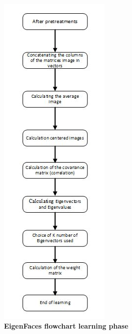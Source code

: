 \begin{figure}[bth]%
\begin{center}
\includegraphics[scale=0.85]{ef_learningphase}%
\caption{\textbf{EigenFaces flowchart learning phase}}%
\label{ef_learningphase}%
\end {center}
\end{figure}	


